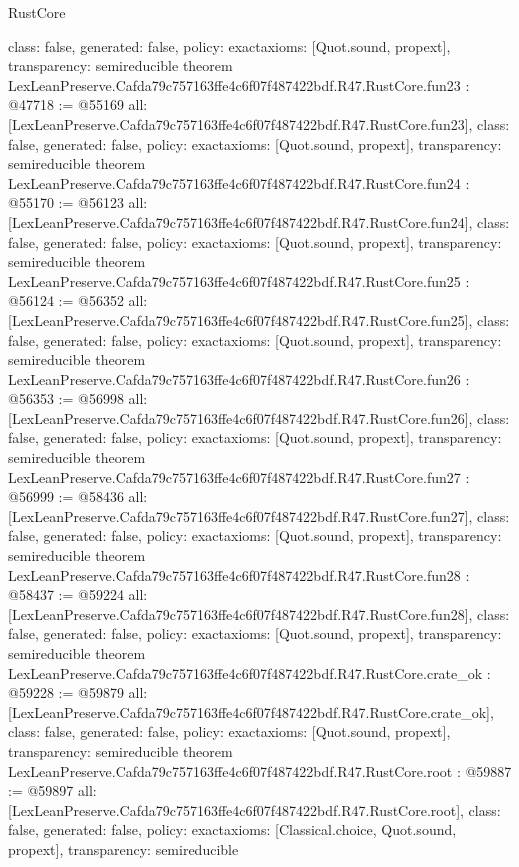 \begin{lexlean}{RustCore}
\begin{coremodule}
{  class: false,
  generated: false,
  policy: exact{axioms: [Quot.sound, propext]},
  transparency: semireducible
}
theorem LexLeanPreserve.Cafda79c757163ffe4c6f07f487422bdf.R47.RustCore.fun23 : @47718 := @55169 {
  all: [LexLeanPreserve.Cafda79c757163ffe4c6f07f487422bdf.R47.RustCore.fun23],
  class: false,
  generated: false,
  policy: exact{axioms: [Quot.sound, propext]},
  transparency: semireducible
}
theorem LexLeanPreserve.Cafda79c757163ffe4c6f07f487422bdf.R47.RustCore.fun24 : @55170 := @56123 {
  all: [LexLeanPreserve.Cafda79c757163ffe4c6f07f487422bdf.R47.RustCore.fun24],
  class: false,
  generated: false,
  policy: exact{axioms: [Quot.sound, propext]},
  transparency: semireducible
}
theorem LexLeanPreserve.Cafda79c757163ffe4c6f07f487422bdf.R47.RustCore.fun25 : @56124 := @56352 {
  all: [LexLeanPreserve.Cafda79c757163ffe4c6f07f487422bdf.R47.RustCore.fun25],
  class: false,
  generated: false,
  policy: exact{axioms: [Quot.sound, propext]},
  transparency: semireducible
}
theorem LexLeanPreserve.Cafda79c757163ffe4c6f07f487422bdf.R47.RustCore.fun26 : @56353 := @56998 {
  all: [LexLeanPreserve.Cafda79c757163ffe4c6f07f487422bdf.R47.RustCore.fun26],
  class: false,
  generated: false,
  policy: exact{axioms: [Quot.sound, propext]},
  transparency: semireducible
}
theorem LexLeanPreserve.Cafda79c757163ffe4c6f07f487422bdf.R47.RustCore.fun27 : @56999 := @58436 {
  all: [LexLeanPreserve.Cafda79c757163ffe4c6f07f487422bdf.R47.RustCore.fun27],
  class: false,
  generated: false,
  policy: exact{axioms: [Quot.sound, propext]},
  transparency: semireducible
}
theorem LexLeanPreserve.Cafda79c757163ffe4c6f07f487422bdf.R47.RustCore.fun28 : @58437 := @59224 {
  all: [LexLeanPreserve.Cafda79c757163ffe4c6f07f487422bdf.R47.RustCore.fun28],
  class: false,
  generated: false,
  policy: exact{axioms: [Quot.sound, propext]},
  transparency: semireducible
}
theorem LexLeanPreserve.Cafda79c757163ffe4c6f07f487422bdf.R47.RustCore.crate_ok : @59228 := @59879 {
  all: [LexLeanPreserve.Cafda79c757163ffe4c6f07f487422bdf.R47.RustCore.crate_ok],
  class: false,
  generated: false,
  policy: exact{axioms: [Quot.sound, propext]},
  transparency: semireducible
}
theorem LexLeanPreserve.Cafda79c757163ffe4c6f07f487422bdf.R47.RustCore.root : @59887 := @59897 {
  all: [LexLeanPreserve.Cafda79c757163ffe4c6f07f487422bdf.R47.RustCore.root],
  class: false,
  generated: false,
  policy: exact{axioms: [Classical.choice, Quot.sound, propext]},
  transparency: semireducible
}


\end{coremodule}
\end{lexlean}
